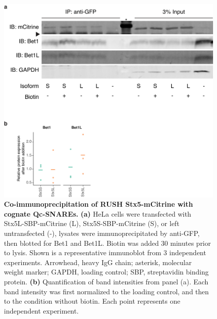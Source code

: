 \clearpage

\begin{figure}
    \includegraphics[keepaspectratio=true,width=\textwidth,height=\textheight]{chapters/chapter6/chapter6_SupplementaryFigure16.pdf}
    \caption{\textbf{Co-immunoprecipitation of RUSH Stx5-mCitrine with cognate Qc-SNAREs.} \textbf{(a)} HeLa cells were transfected with Stx5L-SBP-mCitrine (L), Stx5S-SBP-mCitrine (S), or left untransfected (-), lysates were immunoprecipitated by anti-GFP, then blotted for Bet1 and Bet1L. Biotin was added 30 minutes prior to lysis. Shown is a representative immunoblot from 3 independent experiments. Arrowhead, heavy IgG chain; asterisk, molecular weight marker; GAPDH, loading control; SBP, streptavidin binding protein. \textbf{(b)} Quantification of band intensities from panel (a). Each band intensity was first normalized to the loading control, and then to the condition without biotin. Each point represents one independent experiment.}
    \label{fig:ch6supfig16}
\end{figure}

\clearpage

